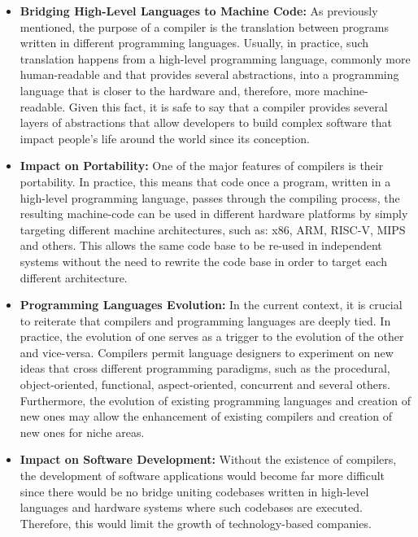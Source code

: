 \begin{itemize}
    \item \textbf{Bridging High-Level Languages to Machine Code:} As previously mentioned, the purpose of a compiler is the translation between programs written in different programming languages. Usually, in practice, such translation happens from a high-level programming language, commonly more human-readable and that provides several abstractions, into a programming language that is closer to the hardware and, therefore, more machine-readable. Given this fact, it is safe to say that a compiler provides several layers of abstractions that allow developers to build complex software that impact people's life around the world since its conception.
    
    \item \textbf{Impact on Portability:} One of the major features of compilers is their portability. In practice, this means that code once a program, written in a high-level programming language, passes through the compiling process, the resulting machine-code can be used in different hardware platforms by simply targeting different machine architectures, such as: x86, ARM, RISC-V, MIPS and others. This allows the same code base to be re-used in independent systems without the need to rewrite the code base in order to target each different architecture.
    
    \item \textbf{Programming Languages Evolution:} In the current context, it is crucial to reiterate that compilers and programming languages are deeply tied. In practice, the evolution of one serves as a trigger to the evolution of the other and vice-versa. Compilers permit language designers to experiment on new ideas that cross different programming paradigms, such as the procedural, object-oriented, functional, aspect-oriented, concurrent and several others. Furthermore, the evolution of existing programming languages and creation of new ones may allow the enhancement of existing compilers and creation of new ones for niche areas.
    
    \item \textbf{Impact on Software Development:} Without the existence of compilers, the development of software applications would become far more difficult since there would be no bridge uniting codebases written in high-level languages and hardware systems where such codebases are executed. Therefore, this would limit the growth of technology-based companies.
\end{itemize}

